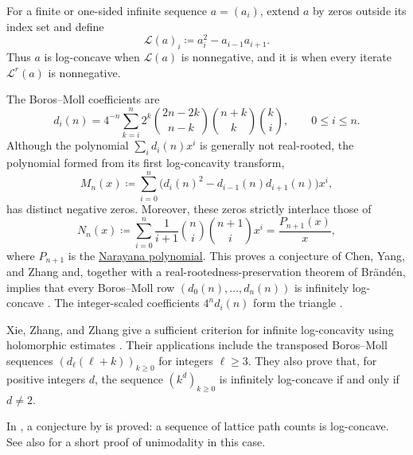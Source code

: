 \begin{example*}
For a finite or one-sided infinite sequence $a=(a_i)$, extend $a$ by zeros
outside its index set and define
\[
  \mathcal L(a)_i \coloneqq a_i^2-a_{i-1}a_{i+1}.
\]
Thus $a$ is log-concave when \(\mathcal L(a)\) is nonnegative, and it is
\label{infinitelyLogConcave} when every iterate
\(\mathcal L^r(a)\) is nonnegative.

The Boros--Moll coefficients are
\[
  d_i(n)=4^{-n}\sum_{k=i}^n
  2^k\binom{2n-2k}{n-k}\binom{n+k}{k}\binom{k}{i},
  \qquad 0\leq i\leq n.
\]
Although the polynomial \(\sum_i d_i(n)x^i\) is generally not real-rooted,
the polynomial formed from its first log-concavity transform,
\[
  M_n(x)\coloneqq \sum_{i=0}^n
  \bigl(d_i(n)^2-d_{i-1}(n)d_{i+1}(n)\bigr)x^i,
\]
has distinct negative zeros.  Moreover, these zeros strictly interlace those
of
\[
  N_n(x)\coloneqq \sum_{i=0}^n
  \frac{1}{i+1}\binom{n}{i}\binom{n+1}{i}x^i
  =\frac{P_{n+1}(x)}{x},
\]
where $P_{n+1}$ is the \hyperref[ex:narayanaSturm]{Narayana polynomial}.
This proves a conjecture of Chen, Yang, and Zhang and, together with a
real-rootedness-preservation theorem of Brändén, implies that every
Boros--Moll row $(d_0(n),\dotsc,d_n(n))$ is infinitely log-concave
\cite[Thm.~1.1 and Cor.~1.2]{XieZhang2026InfiniteLogConcavity}.
The integer-scaled coefficients $4^n d_i(n)$ form the triangle
.
\end{example*}

Xie, Zhang, and Zhang give a sufficient criterion for infinite log-concavity
using holomorphic estimates \cite{XieZhangZhang2026InfiniteLogConcavity}.
Their applications include the transposed Boros--Moll sequences
$(d_\ell(\ell+k))_{k\geq0}$ for integers $\ell\geq3$.
They also prove that, for positive integers $d$, the sequence
$(k^d)_{k\geq0}$ is infinitely log-concave if and only if $d\ne2$.


In \cite{Wang2002}, a conjecture by  is proved:
a sequence of lattice path counts is log-concave.
See also \cite{Sagan1987unimodal} for a short proof of unimodality in this case.

